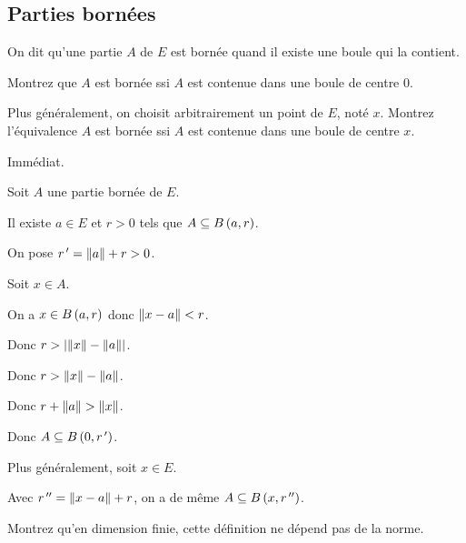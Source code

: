 \subsection{Parties bornées}

\begin{defi}
On dit qu'une partie \(A\) de \(E\) est bornée quand il existe une boule qui la contient.
\end{defi}

\begin{exo}
Montrez que \(A\) est bornée ssi \(A\) est contenue dans une boule de centre \(0\).

Plus généralement, on choisit arbitrairement un point de \(E\), noté \(x\). Montrez l'équivalence \(A\) est bornée ssi \(A\) est contenue dans une boule de centre \(x\).
\end{exo}

\begin{corr}
\imprec Immédiat.

\impdir

Soit \(A\) une partie bornée de \(E\).

Il existe \(a\in E\) et \(r>0\) tels que \(A\subset\bouleo{a}{r}\).

On pose \(r\prim=\norme{a}+r>0\).

Soit \(x\in A\).

On a \(x\in\bouleo{a}{r}\) donc \(\norme{x-a}<r\).

Donc \(r>\abs{\norme{x}-\norme{a}}\).

Donc \(r>\norme{x}-\norme{a}\).

Donc \(r+\norme{a}>\norme{x}\).

Donc \(A\subset\bouleo{0}{r\prim}\).
\end{corr}

\begin{corr}
Plus généralement, soit \(x\in E\).

Avec \(r\seconde=\norme{x-a}+r\), on a de même \(A\subset\bouleo{x}{r\seconde}\).
\end{corr}

\begin{exo}
Montrez qu'en dimension finie, cette définition ne dépend pas de la norme.
\end{exo}

